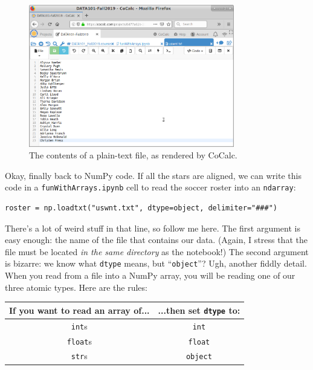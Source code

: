 \begin{figure}[ht]
\centering
\includegraphics[width=0.8\textwidth]{textFile.png}
\medskip
\caption{The contents of a plain-text file, as rendered by CoCalc.}
\label{fig:textFile}
\end{figure}

Okay, finally back to NumPy code. If all the stars are aligned, we can write
this code in a \texttt{funWithArrays.ipynb} cell to read the soccer roster into
an \texttt{ndarray}:

\begin{Verbatim}[fontsize=\small,samepage=true,frame=single,framesep=3mm]
roster = np.loadtxt("uswnt.txt", dtype=object, delimiter="###")
\end{Verbatim}

There's a lot of weird stuff in that line, so follow me here. The first
argument is easy enough: the name of the file that contains our data. (Again, I
stress that the file must be located \textit{in the same directory} as the
notebook!) The second argument is bizarre: we know what \texttt{dtype} means,
but ``\texttt{object}''? Ugh, another fiddly detail. When you read from a file
into a NumPy array, you will be reading one of our three atomic types. Here are
the rules:

\begin{center}
\begin{tabular}{c|c}
If you want to read an array of... & ...then set \texttt{dtype} to: \\
\hline
\texttt{int}s & \texttt{int} \\
\texttt{float}s & \texttt{float} \\
\texttt{str}s & \texttt{object} \\
\end{tabular}
\end{center}

